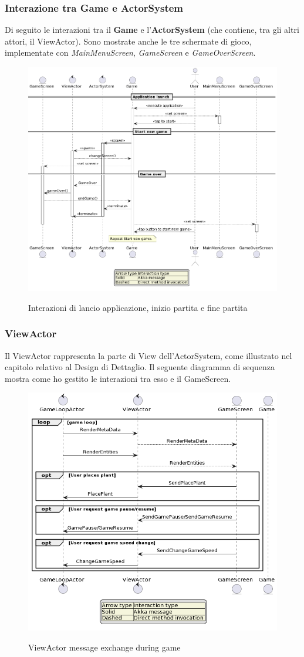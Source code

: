 \subsubsection{Interazione tra Game e ActorSystem}
Di seguito le interazioni tra il \textbf{Game} e l'\textbf{ActorSystem} (che contiene, tra gli altri attori, il ViewActor).
Sono mostrate anche le tre schermate di gioco, implementate con \textit{MainMenuScreen}, \textit{GameScreen} e \textit{GameOverScreen}.


\begin{figure}[H]
    \centering
    \caption{Interazioni di lancio applicazione, inizio partita e fine partita}
    \includegraphics[width=0.8\linewidth]{images/actors-game-interaction.png}
    \label{ScreenBehavior}
\end{figure}


\subsubsection{ViewActor}
Il ViewActor rappresenta la parte di View dell'ActorSystem, come illustrato nel capitolo relativo al Design di Dettaglio. Il seguente diagramma di sequenza mostra come ho gestito le interazioni tra esso e il GameScreen.

\begin{figure}[H]
    \centering
    \caption{ViewActor message exchange during game}
    \includegraphics[width=0.8\linewidth]{images/view-actor.png}
    \label{ScreenBehavior}
\end{figure}

